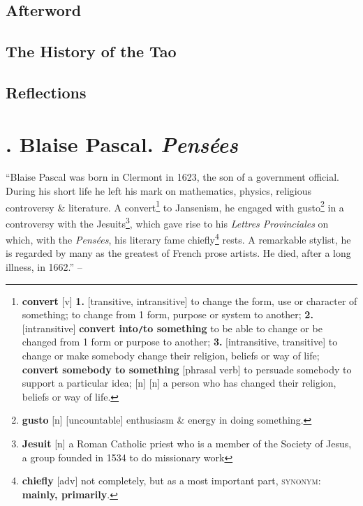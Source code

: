 \documentclass[oneside]{book}
\numberwithin{equation}{section}
\begin{document}

\section{Afterword}


\section{The History of the Tao}


\section{Reflections}


\chapter{\cite{Pascal2003}. Blaise Pascal. \textit{Pens\'ees}}

``Blaise Pascal was born in Clermont in 1623, the son of a government official. During his short life he left his mark on mathematics, physics, religious controversy \& literature. A convert\footnote{\textbf{convert} [v] \textbf{1.} [transitive, intransitive] to change the form, use or character of something; to change from 1 form, purpose or system to another; \textbf{2.} [intransitive] \textbf{convert into\texttt{/}to something} to be able  to change or be changed from 1 form or purpose to another; \textbf{3.} [intransitive, transitive] to change or make somebody change their religion, beliefs or way of life; \textbf{convert somebody to something} [phrasal verb] to persuade somebody to support a particular idea; [n] [n] a person who has changed their religion, beliefs or way of life.} to Jansenism, he engaged with gusto\footnote{\textbf{gusto} [n] [uncountable] enthusiasm \& energy in doing something.} in a controversy with the Jesuits\footnote{\textbf{Jesuit} [n] a Roman Catholic priest who is a member of the Society of Jesus, a group founded in 1534 to do missionary work}, which gave rise to his \textit{Lettres Provinciales} on which, with the \textit{Pens\'ees}, his literary fame chiefly\footnote{\textbf{chiefly} [adv] not completely, but as a most important part, \textsc{synonym}: \textbf{mainly, primarily}.} rests. A remarkable stylist, he is regarded by many as the greatest of French prose artists. He died, after a long illness, in 1662.'' -- \cite[p. 6]{Pascal2003}
\end{document}
